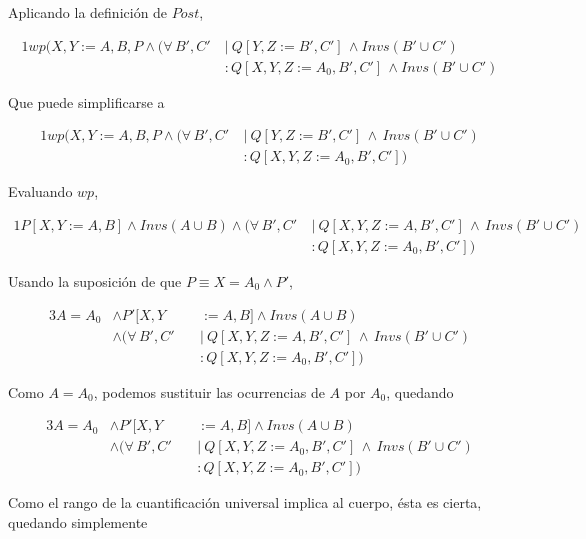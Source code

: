 Aplicando la definición de $Post$,

\begin{alignat}{1}%
wp(X,Y := A,B, P \land (\forall\, B',C'\ &|\ Q [Y,Z := B',C']\, \land Invs (B' \cup C')  \nonumber \\
                                       &:  Q [X,Y,Z := A_0, B',C']\, \land Invs (B' \cup C')
\end{alignat}

Que puede simplificarse a

\begin{alignat}{1}%
wp(X,Y := A,B, P \land (\forall\, B',C'\ &|\ Q [Y,Z := B',C']\, \land\, Invs (B' \cup C')  \nonumber \\
                                       &:  Q [X,Y,Z := A_0, B',C'])
\end{alignat}

\newpage
Evaluando $wp$,

\begin{alignat}{1}%
P[X,Y := A,B] \land Invs (A \cup B) \land (\forall\, B',C'\ &|\ Q [X,Y,Z := A,B',C']\, \land\, Invs (B' \cup C')  \nonumber \\
                                                          &:  Q [X,Y,Z := A_0, B',C'])
\end{alignat}

Usando la suposición de que $P \equiv X = A_0 \land P'$,

\begin{alignat}{3}%
A = A_0 & \land P'[X,Y &&:= A,B] \land Invs (A \cup B) \nonumber \\
        & \land (\forall\, B',C'\ &&|\ Q [X,Y,Z := A,B',C']\, \land\, Invs (B' \cup C')  \nonumber \\
        &                         &&:  Q [X,Y,Z := A_0,B',C'])
\end{alignat}

Como $A = A_0$, podemos sustituir las ocurrencias de $A$ por $A_0$, quedando

\begin{alignat}{3}%
A = A_0 & \land P'[X,Y &&:= A,B] \land Invs (A \cup B) \nonumber \\
        & \land (\forall\, B',C'\ &&|\ Q [X,Y,Z := A_0,B',C']\, \land\, Invs (B' \cup C')  \nonumber \\
        &                         &&:  Q [X,Y,Z := A_0,B',C'])
\end{alignat}

Como el rango de la cuantificación universal implica al cuerpo, ésta es cierta,
quedando simplemente

